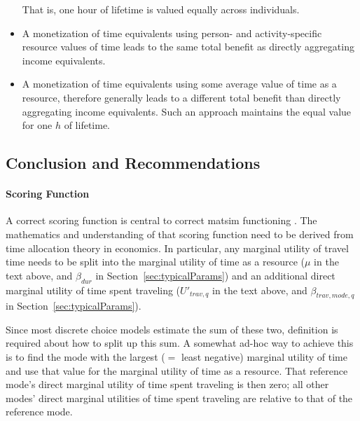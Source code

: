 \begin{itemize}
%
That is, one hour of lifetime is valued equally across individuals.
%
\item A monetization of time equivalents using person- and activity-specific resource values of time leads to the same total benefit as directly aggregating income equivalents. 
%
\item A monetization of time equivalents using some average value of time as a resource, therefore generally leads to a different total benefit than directly aggregating income equivalents.  Such an approach maintains the equal value for one $h$ of lifetime.
%
\end{itemize}


\subsection{Conclusion and Recommendations}
%
%
\paragraph*{Scoring Function}

A correct scoring function is central to correct \acrshort{matsim} functioning .
%
The mathematics and understanding of that scoring function need to be derived from time allocation theory in economics.  In particular, any marginal utility of travel time needs to be split into the marginal utility of time as a resource ($\mu$ in the text above, and $\beta_{dur}$ in Section~\ref{sec:typicalParams}) and an additional direct marginal utility of time spent traveling ($U'_{trav,q}$ in the text above, and $\beta_{trav,mode,q}$ in Section~\ref{sec:typicalParams}).

Since most discrete choice models estimate the sum of these two, definition is required about how to split up this sum.  A somewhat ad-hoc way to achieve this is to find the mode with the largest ($=$ least negative) marginal utility of time and use that value for the marginal utility of time as a resource.  That reference mode's direct marginal utility of time spent traveling is then zero; all other modes' direct marginal utilities of time spent traveling are relative to that of the reference mode.


